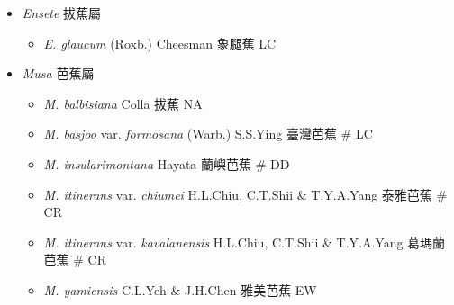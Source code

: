 
  \begin{itemize}
 \item[] \textit{Ensete} 拔蕉屬
                                
  \begin{itemize}
        \item[] \textit{E. glaucum} (Roxb.) Cheesman  象腿蕉   LC
  \end{itemize}
 \item[] \textit{Musa} 芭蕉屬
                                
  \begin{itemize}
        \item[] \textit{M. balbisiana} Colla  拔蕉   NA
        \item[] \textit{M. basjoo} var. \textit{formosana} (Warb.) S.S.Ying  臺灣芭蕉  \# LC
        \item[] \textit{M. insularimontana} Hayata  蘭嶼芭蕉  \# DD
        \item[] \textit{M. itinerans} var. \textit{chiumei} H.L.Chiu, C.T.Shii \& T.Y.A.Yang  泰雅芭蕉  \# CR
        \item[] \textit{M. itinerans} var. \textit{kavalanensis} H.L.Chiu, C.T.Shii \& T.Y.A.Yang  葛瑪蘭芭蕉  \# CR
        \item[] \textit{M. yamiensis} C.L.Yeh \& J.H.Chen  雅美芭蕉   EW
  \end{itemize}
  \end{itemize}
